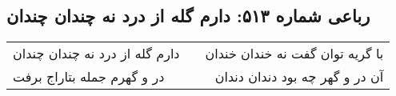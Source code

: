 \begin{center}
\section*{رباعی شماره ۵۱۳: دارم گله از درد نه چندان چندان}
\label{sec:sh513}
\begin{longtable}{l p{0.5cm} r}
دارم گله از درد نه چندان چندان
&&
با گریه توان گفت نه خندان خندان
\\
در و گهرم جمله بتاراج برفت
&&
آن در و گهر چه بود دندان دندان
\\
\end{longtable}
\end{center}
